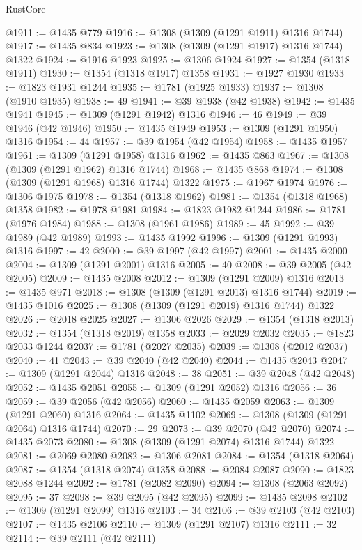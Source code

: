 \begin{lexlean}{RustCore}
\begin{coremodule}
@1911 := @1435 @779
@1916 := @1308 (@1309 (@1291 @1911) @1316 @1744)
@1917 := @1435 @834
@1923 := @1308 (@1309 (@1291 @1917) @1316 @1744) @1322
@1924 := @1916 @1923
@1925 := @1306 @1924
@1927 := @1354 (@1318 @1911)
@1930 := @1354 (@1318 @1917) @1358
@1931 := @1927 @1930
@1933 := @1823 @1931 @1244
@1935 := @1781 (@1925 @1933)
@1937 := @1308 (@1910 @1935)
@1938 := 49
@1941 := @39 @1938 (@42 @1938)
@1942 := @1435 @1941
@1945 := @1309 (@1291 @1942) @1316
@1946 := 46
@1949 := @39 @1946 (@42 @1946)
@1950 := @1435 @1949
@1953 := @1309 (@1291 @1950) @1316
@1954 := 44
@1957 := @39 @1954 (@42 @1954)
@1958 := @1435 @1957
@1961 := @1309 (@1291 @1958) @1316
@1962 := @1435 @863
@1967 := @1308 (@1309 (@1291 @1962) @1316 @1744)
@1968 := @1435 @868
@1974 := @1308 (@1309 (@1291 @1968) @1316 @1744) @1322
@1975 := @1967 @1974
@1976 := @1306 @1975
@1978 := @1354 (@1318 @1962)
@1981 := @1354 (@1318 @1968) @1358
@1982 := @1978 @1981
@1984 := @1823 @1982 @1244
@1986 := @1781 (@1976 @1984)
@1988 := @1308 (@1961 @1986)
@1989 := 45
@1992 := @39 @1989 (@42 @1989)
@1993 := @1435 @1992
@1996 := @1309 (@1291 @1993) @1316
@1997 := 42
@2000 := @39 @1997 (@42 @1997)
@2001 := @1435 @2000
@2004 := @1309 (@1291 @2001) @1316
@2005 := 40
@2008 := @39 @2005 (@42 @2005)
@2009 := @1435 @2008
@2012 := @1309 (@1291 @2009) @1316
@2013 := @1435 @971
@2018 := @1308 (@1309 (@1291 @2013) @1316 @1744)
@2019 := @1435 @1016
@2025 := @1308 (@1309 (@1291 @2019) @1316 @1744) @1322
@2026 := @2018 @2025
@2027 := @1306 @2026
@2029 := @1354 (@1318 @2013)
@2032 := @1354 (@1318 @2019) @1358
@2033 := @2029 @2032
@2035 := @1823 @2033 @1244
@2037 := @1781 (@2027 @2035)
@2039 := @1308 (@2012 @2037)
@2040 := 41
@2043 := @39 @2040 (@42 @2040)
@2044 := @1435 @2043
@2047 := @1309 (@1291 @2044) @1316
@2048 := 38
@2051 := @39 @2048 (@42 @2048)
@2052 := @1435 @2051
@2055 := @1309 (@1291 @2052) @1316
@2056 := 36
@2059 := @39 @2056 (@42 @2056)
@2060 := @1435 @2059
@2063 := @1309 (@1291 @2060) @1316
@2064 := @1435 @1102
@2069 := @1308 (@1309 (@1291 @2064) @1316 @1744)
@2070 := 29
@2073 := @39 @2070 (@42 @2070)
@2074 := @1435 @2073
@2080 := @1308 (@1309 (@1291 @2074) @1316 @1744) @1322
@2081 := @2069 @2080
@2082 := @1306 @2081
@2084 := @1354 (@1318 @2064)
@2087 := @1354 (@1318 @2074) @1358
@2088 := @2084 @2087
@2090 := @1823 @2088 @1244
@2092 := @1781 (@2082 @2090)
@2094 := @1308 (@2063 @2092)
@2095 := 37
@2098 := @39 @2095 (@42 @2095)
@2099 := @1435 @2098
@2102 := @1309 (@1291 @2099) @1316
@2103 := 34
@2106 := @39 @2103 (@42 @2103)
@2107 := @1435 @2106
@2110 := @1309 (@1291 @2107) @1316
@2111 := 32
@2114 := @39 @2111 (@42 @2111)

\end{coremodule}
\end{lexlean}
